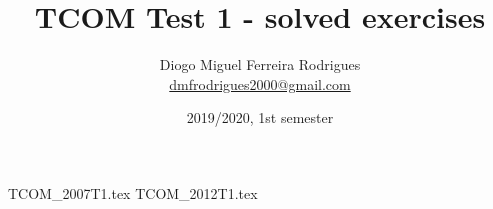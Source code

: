 \documentclass{tcom}
\title{TCOM Test 1 - solved exercises}
\author{Diogo Miguel Ferreira Rodrigues \\ \href{mailto:dmfrodrigues2000@gmail.com}{dmfrodrigues2000@gmail.com}}
\date{2019/2020, 1st semester}
\begin{document}
\begingroup
	\maketitle
	\let\clearpage\relax
	\setcounter{tocdepth}{2}
	\tableofcontents
\endgroup
\setcounter{section}{6}
{TCOM_2007T1.tex}
{TCOM_2012T1.tex}
\end{document}
